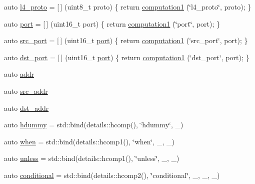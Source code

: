\begin{DoxyCompactItemize}
auto \hyperlink{namespacepfq__lang_1_1anonymous__namespace_02default_8hpp_03_a75da77904f1cff4cc42fc3a081f80670}{l4\-\_\-proto} = \mbox{[}$\,$\mbox{]} (uint8\-\_\-t proto) \{ return \hyperlink{namespacepfq__lang_a58e7e358fc7c95121f74d56c094b1627}{computation1} (\char`\"{}l4\-\_\-proto\char`\"{}, proto); \}
\item 
auto \hyperlink{namespacepfq__lang_1_1anonymous__namespace_02default_8hpp_03_a1b370b44e5eedc364f3bb306d5042738}{port} = \mbox{[}$\,$\mbox{]} (uint16\-\_\-t port) \{ return \hyperlink{namespacepfq__lang_a58e7e358fc7c95121f74d56c094b1627}{computation1} (\char`\"{}port\char`\"{}, port); \}
\item 
auto \hyperlink{namespacepfq__lang_1_1anonymous__namespace_02default_8hpp_03_ad4d03d1e69ba9608a2d87ac91a2b521f}{src\-\_\-port} = \mbox{[}$\,$\mbox{]} (uint16\-\_\-t \hyperlink{namespacepfq__lang_1_1anonymous__namespace_02default_8hpp_03_a1b370b44e5eedc364f3bb306d5042738}{port}) \{ return \hyperlink{namespacepfq__lang_a58e7e358fc7c95121f74d56c094b1627}{computation1} (\char`\"{}src\-\_\-port\char`\"{}, port); \}
\item 
auto \hyperlink{namespacepfq__lang_1_1anonymous__namespace_02default_8hpp_03_aceccbe6ec912638fb8d5d3d9e0372a09}{dst\-\_\-port} = \mbox{[}$\,$\mbox{]} (uint16\-\_\-t \hyperlink{namespacepfq__lang_1_1anonymous__namespace_02default_8hpp_03_a1b370b44e5eedc364f3bb306d5042738}{port}) \{ return \hyperlink{namespacepfq__lang_a58e7e358fc7c95121f74d56c094b1627}{computation1} (\char`\"{}dst\-\_\-port\char`\"{}, port); \}
\item 
auto \hyperlink{namespacepfq__lang_1_1anonymous__namespace_02default_8hpp_03_aafce8334d1be83bff9a2115439c8c453}{addr}
\item 
auto \hyperlink{namespacepfq__lang_1_1anonymous__namespace_02default_8hpp_03_a63c87ff605d7cefa807fd61bc463785d}{src\-\_\-addr}
\item 
auto \hyperlink{namespacepfq__lang_1_1anonymous__namespace_02default_8hpp_03_a4b72bac7c3af312ffe7c670eb2583f9a}{dst\-\_\-addr}
\item 
auto \hyperlink{namespacepfq__lang_1_1anonymous__namespace_02default_8hpp_03_a4e7cf4874b42c5722f420fc54f360242}{hdummy} = std\-::bind(details\-::hcomp(), \char`\"{}hdummy\char`\"{}, \-\_)
\item 
auto \hyperlink{namespacepfq__lang_1_1anonymous__namespace_02default_8hpp_03_a10e1a2f363aa41a978622f322ac6241f}{when} = std\-::bind(details\-::hcomp1(), \char`\"{}when\char`\"{}, \-\_, \-\_)
\item 
auto \hyperlink{namespacepfq__lang_1_1anonymous__namespace_02default_8hpp_03_af01f3831a7b0294b6ffef87a09b481d7}{unless} = std\-::bind(details\-::hcomp1(), \char`\"{}unless\char`\"{}, \-\_, \-\_)
\item 
auto \hyperlink{namespacepfq__lang_1_1anonymous__namespace_02default_8hpp_03_a022d0075edf2fff575b93377aec0c228}{conditional} = std\-::bind(details\-::hcomp2(), \char`\"{}conditional\char`\"{}, \-\_, \-\_, \-\_)
\end{DoxyCompactItemize}


